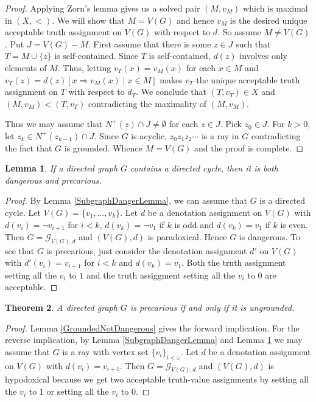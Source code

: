 \documentclass[12pt]{article}
\newtheorem{thm}{Theorem}
\newtheorem{lem}[thm]{Lemma}
\theoremstyle{remark}
\newcommand{\fancy}[1]{\mathcal{#1}}
\def\G{\fancy{G}}
\begin{document}
\begin{proof}
Applying Zorn's lemma gives us a solved pair $(M, v_M)$ which is maximal in $(X, <)$.  We will show that $M = V(G)$ and hence $v_M$ is the desired unique acceptable truth assignment on $V(G)$ with respect to $d$.  So assume $M \neq V(G)$.  Put $J = V(G) - M$. First assume that there is some $z \in J$ such that $T = M \cup \{z\}$ is self-contained.  Since $T$ is self-contained, $d(z)$ involves only elements of $M$.  Thus, letting $v_T(x) = v_M(x)$ for each $x \in M$ and $v_T(z) = d(z)[x \Rightarrow v_M(x) \mid x \in M]$ makes $v_T$ the unique acceptable truth assignment on $T$ with respect to $d_T$.  We conclude that $(T, v_T) \in X$ and $(M, v_M) < (T, v_T)$ contradicting the maximality of $(M, v_M)$.\newline

Thus we may assume that $N^+(z) \cap J \neq \emptyset$ for each $z \in J$.  Pick $z_0 \in J$.  For $k > 0$, let $z_k \in N^+(z_{k - 1}) \cap J$.  Since $G$ is acyclic, $z_0z_1z_2\cdots$ is a ray in $G$ contradicting the fact that $G$ is grounded.  Whence $M = V(G)$ and the proof is complete.
\end{proof}

\begin{lem}\label{DirectedCyclesMakeDanger}
If a directed graph $G$ contains a directed cycle, then it is both dangerous and precarious.
\end{lem}
\begin{proof}
By Lemma \ref{SubgraphDangerLemma}, we can assume that $G$ is a directed cycle.  Let $V(G) = \{v_1, \ldots, v_k\}$.  Let $d$ be a denotation assignment on $V(G)$ with $d(v_i) = \neg v_{i + 1}$ for $i < k$, $d(v_k) = \neg v_1$ if $k$ is odd and $d(v_k) = v_1$ if $k$ is even.  Then $G = \G_{V(G), d}$ and $(V(G), d)$ is paradoxical.  Hence $G$ is dangerous.  To see that $G$ is precarious, just consider the denotation assignment $d'$ on $V(G)$ with $d'(v_i) = v_{i + 1}$ for $i < k$ and $d(v_k) = v_1$.  Both the truth assignment setting all the $v_i$ to $1$ and the truth assiggment setting all the $v_i$ to $0$ are acceptable.
\end{proof}

\begin{thm}\label{PrecariousCharacterization}
A directed graph $G$ is precarious if and only if it is ungrounded.
\end{thm}
\begin{proof}
Lemma \ref{GroundedNotDangerous} gives the forward implication.  For the reverse implication, by Lemma \ref{SubgraphDangerLemma} and Lemma \ref{DirectedCyclesMakeDanger} we may assume that $G$ is a ray with vertex set $\{v_i\}_{i < \omega}$.  Let $d$ be a denotation assignment on $V(G)$ with $d(v_i) = v_{i+1}$.  Then $G = \G_{V(G), d}$ and $(V(G), d)$ is hypodoxical because we get two acceptable truth-value assignments by setting all the $v_i$ to $1$ or setting all the $v_i$ to $0$.
\end{proof}
\end{document}
